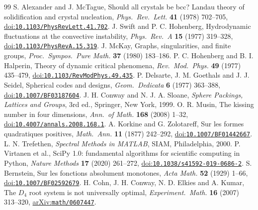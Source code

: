 \documentclass[a4paper,11pt]{article}
\numberwithin{equation}{section}
\theoremstyle{jsplain}
\theoremstyle{jsrem}
\begin{document}
\begin{thebibliography}{99}
\small
{} S. Alexander and J. McTague, Should all crystals be bcc? Landau theory of solidification and crystal nucleation, \textit{Phys.\ Rev.\ Lett.} \textbf{41} (1978) 702--705, \href{https://doi.org/10.1103/PhysRevLett.41.702}{doi:\nolinkurl{10.1103/PhysRevLett.41.702}}.
 J. Swift and P. C. Hohenberg, Hydrodynamic fluctuations at the convective instability, \textit{Phys.\ Rev.\ A} \textbf{15} (1977) 319--328, \href{https://doi.org/10.1103/PhysRevA.15.319}{doi:\nolinkurl{10.1103/PhysRevA.15.319}}.
 J. McKay, Graphs, singularities, and finite groups, \textit{Proc.\ Sympos.\ Pure Math.} \textbf{37} (1980) 183--186.
 P. C. Hohenberg and B. I. Halperin, Theory of dynamic critical phenomena, \textit{Rev.\ Mod.\ Phys.} \textbf{49} (1977) 435--479, \href{https://doi.org/10.1103/RevModPhys.49.435}{doi:\nolinkurl{10.1103/RevModPhys.49.435}}.
 P. Delsarte, J. M. Goethals and J. J. Seidel, Spherical codes and designs, \textit{Geom.\ Dedicata} \textbf{6} (1977) 363--388, \href{https://doi.org/10.1007/BF03187604}{doi:\nolinkurl{10.1007/BF03187604}}.
 J. H. Conway and N. J. A. Sloane, \textit{Sphere Packings, Lattices and Groups}, 3rd ed., Springer, New York, 1999.
 O. R. Musin, The kissing number in four dimensions, \textit{Ann.\ of Math.} \textbf{168} (2008) 1--32, \href{https://doi.org/10.4007/annals.2008.168.1}{doi:\nolinkurl{10.4007/annals.2008.168.1}}.
 A. Korkine and G. Zolotareff, Sur les formes quadratiques positives, \textit{Math.\ Ann.} \textbf{11} (1877) 242--292, \href{https://doi.org/10.1007/BF01442667}{doi:\nolinkurl{10.1007/BF01442667}}.
 L. N. Trefethen, \textit{Spectral Methods in MATLAB}, SIAM, Philadelphia, 2000.
 P. Virtanen et al., SciPy 1.0: fundamental algorithms for scientific computing in Python, \textit{Nature Methods} \textbf{17} (2020) 261--272, \href{https://doi.org/10.1038/s41592-019-0686-2}{doi:\nolinkurl{10.1038/s41592-019-0686-2}}.
 S. Bernstein, Sur les fonctions absolument monotones, \textit{Acta Math.} \textbf{52} (1929) 1--66, \href{https://doi.org/10.1007/BF02592679}{doi:\nolinkurl{10.1007/BF02592679}}.
 H. Cohn, J. H. Conway, N. D. Elkies and A. Kumar, The $D_4$ root system is not universally optimal, \textit{Experiment.\ Math.} \textbf{16} (2007) 313--320, \href{https://arxiv.org/abs/math/0607447}{arXiv:\nolinkurl{math/0607447}}.

\end{thebibliography}
\end{document}
